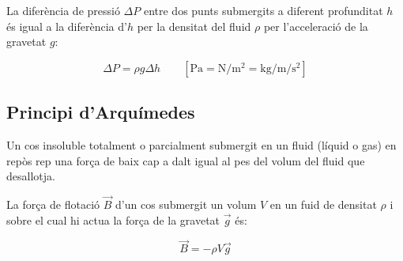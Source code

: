 La diferència de pressió $\Delta P$ entre dos punts submergits a diferent
profunditat $h$ és igual a la diferència d'$h$ per la densitat del fluid $\rho$
per l'acceleració de la gravetat $g$:

\begin{equation}
    \Delta P = \rho g \Delta h \qquad \left[ \si{\pascal} = \si{\newton \per \metre \squared} = \si{\kilo \gram \per\metre \per\second\squared} \right]
\end{equation}

\begin{center}
\end{center}

\subsection{Principi d'Arquímedes}
\label{sub:principi_d_arquimedes}

\begin{displayquote}
    Un cos insoluble totalment o parcialment submergit en un fluid (líquid o gas)
    en repòs rep una força de baix cap a dalt igual al pes del volum del fluid que
    desallotja.
\end{displayquote}

La força de flotació $\vec{B}$ d'un cos submergit un volum $V$ en un fuid de densitat $\rho$ i sobre el cual hi actua la força de la gravetat $\vec{g}$ és:

\begin{equation}
    \vec{B} = -\rho V \vec{g}
\end{equation}

\begin{center}
\end{center}

